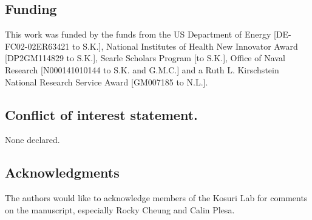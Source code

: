 \documentclass[letterpaper,12pt]{article}
\begin{document}
\subsection*{Funding}
This work was funded by the funds from the US Department of Energy [DE-FC02-02ER63421 to S.K.], National Institutes of Health New Innovator Award [DP2GM114829 to S.K.], Searle Scholars Program [to S.K.], Office of Naval Research [N000141010144 to S.K. and G.M.C.] and a Ruth L. Kirschstein National Research Service Award [GM007185 to N.L.].

\subsection*{Conflict of interest statement.}
None declared.

\subsection*{Acknowledgments}
The authors would like to acknowledge members of the Kosuri Lab for comments on the manuscript, especially Rocky Cheung and Calin Plesa.




%
\end{document}
